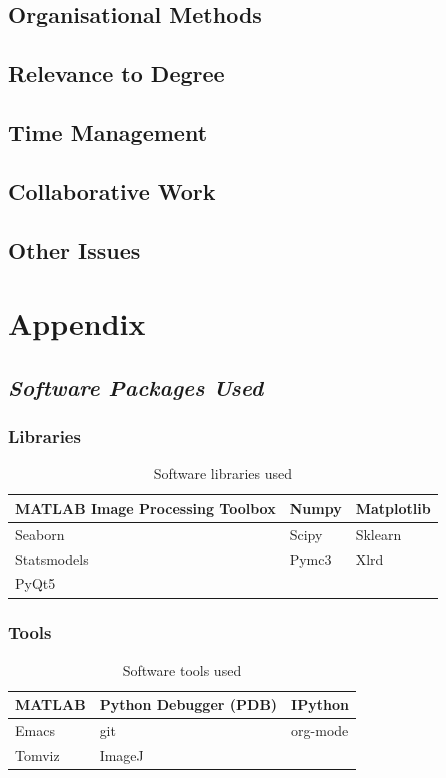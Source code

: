 \documentclass[11pt]{report}
\begin{document}
\section{Organisational Methods}
\label{sec-6-1}
\section{Relevance to Degree}
\label{sec-6-2}
\section{Time Management}
\label{sec-6-3}
\section{Collaborative Work}
\label{sec-6-4}
\section{Other Issues}
\label{sec-6-5}

\chapter{Appendix}
\label{sec-7}
\section{\emph{Software Packages Used}}
\label{sec-7-1}

\subsection{Libraries}
\label{sec-7-1-1}
\begin{table}[htb]
\caption{\label{tab:software}Software libraries used}
\centering
\begin{tabularx}{\textwidth}{|X|X|X|}
\hline
MATLAB Image Processing Toolbox & Numpy & Matplotlib\\
\hline
Seaborn & Scipy & Sklearn\\
\hline
Statsmodels & Pymc3 & Xlrd\\
\hline
PyQt5 &  & \\
\hline
\end{tabularx}
\end{table}

\subsection{Tools}
\label{sec-7-1-2}
\begin{table}[htb]
\caption{\label{tab:softwareused}Software tools used}
\centering
\begin{tabularx}{\textwidth}{|X|X|X|}
\hline
MATLAB & Python Debugger (PDB) & IPython\\
\hline
Emacs & git & org-mode\\
\hline
Tomviz & ImageJ & \\
\hline
\end{tabularx}
\end{table}
\end{document}
